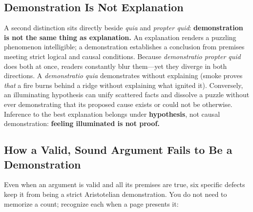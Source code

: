 \subsection{Demonstration Is Not Explanation}

A second distinction sits directly beside \emph{quia} and \emph{propter quid}: \textbf{demonstration is not the same thing as explanation.} An explanation renders a puzzling phenomenon intelligible; a demonstration establishes a conclusion from premises meeting strict logical and causal conditions. Because \emph{demonstratio propter quid} does both at once, readers constantly blur them---yet they diverge in both directions. A \emph{demonstratio quia} demonstrates without explaining (smoke proves \emph{that} a fire burns behind a ridge without explaining what ignited it). Conversely, an illuminating hypothesis can unify scattered facts and dissolve a puzzle without ever demonstrating that its proposed cause exists or could not be otherwise. Inference to the best explanation belongs under \textbf{hypothesis}, not causal demonstration: \textbf{feeling illuminated is not proof.}

\subsection{How a Valid, Sound Argument Fails to Be a Demonstration}

Even when an argument is valid and all its premises are true, six specific defects keep it from being a strict Aristotelian demonstration. You do not need to memorize a count; recognize each when a page presents it:

